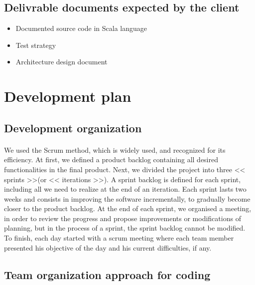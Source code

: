 \documentclass{report}
\begin{document}
\subsection{Delivrable documents expected by the client}

\vspace{1.5mm}
\begin{itemize}
\item Documented source code in Scala language\vspace{1mm}
\item Test strategy\vspace{1mm}
\item Architecture design document\vspace{1mm}
\end{itemize}

\section{Development plan}

\subsection{Development organization}

\paragraph{}
\hspace{4mm}We used the Scrum method, which is widely used, 
and recognized for its efficiency. At first, 
we defined a product backlog containing all desired 
functionalities in the final product. Next, we divided the project into three
 << sprints >>(or << iterations >>). A sprint backlog is defined for 
each sprint, including all we need to realize at the end of an 
iteration. Each sprint lasts two weeks and consists in improving the 
software incrementally, to gradually become closer to the product backlog. 
At the end of each sprint, we organised a meeting, in order to 
review the progress and propose improvements or modifications
 of planning, but in the process of a sprint, the sprint backlog cannot be modified.
 To finish, each day started with a scrum meeting where each team member presented his objective of the day
 and his current difficulties, if any.

\subsection{Team organization approach for coding}
\end{document}
